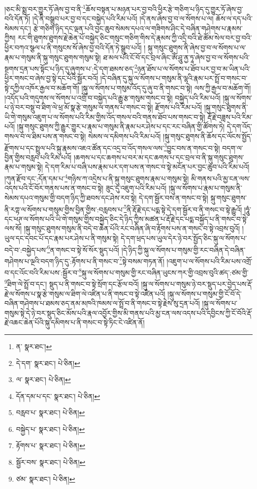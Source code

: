 །ཅང་མི་སྨྲ་བར་གྱུར་ཏོ་ཞེས་བྱ་བ་ནི་\footnote{ན་  སྣར་ཐང་། }ཆོས་བསྟན་པ་མཉན་པར་བྱ་བའི་ཕྱིར་རྩེ་གཅིག་པ་ཉིད་དུ་གྱུར་ཏོ་ཞེས་བྱ་བའི་དོན་ཏོ། །དེ་ནི་བསྒྲུབ་པར་བྱ་བ་དང་བསྐྱེད་པའི་རིམ་པའོ། །དེ་ནས་ཞེས་བྱ་བ་ལ་སོགས་པ་ལ། ཆོས་ལ་དད་པའི་སེམས་དང་། རྩེ་གཅིག་ཉིད་དང་ལྡན་པའི་བྱང་ཆུབ་སེམས་དཔའ་ལ་གཟིགས་ཤིང་དེ་བཞིན་གཤེགས་པ་རྣམས་ཀྱིས། རང་གི་ཐུགས་ཐུགས་རྗེ་ཆེན་པོ་བསྐྱེད་ཅིང་གསུང་གཅིག་གིས་དེ་རྣམས་ཀྱི་འདྲི་བའི་ཐེ་ཚོམ་སེལ་བར་བྱ་བའི་ཕྱིར་བཀའ་སྩལ་པ་ནི་གསུངས་སོ་ཞེས་བྱ་བའི་དོན་ཏེ་སྒྲུབ་པའོ། །
སྐུ་གསུང་ཐུགས་ནི་ཞེས་བྱ་བ་ལ་སོགས་པ་ལ་རྣམ་པ་གསུམ་ནི་སྐུ་གསུང་ཐུགས་གསུམ་སྟེ། ཐ་མལ་པའི་ངོ་བོ་དང་བྲལ་ཞིང་ཨོཾ་ཤཱུ་ནྱ་ཏཱ་ཞེས་བྱ་བ་ལ་སོགས་པའི་སྔགས་དྲན་པས་སྟོང་པ་ཉིད་དུ་ཞུགས་པ་:དེ་དག་ཐམས་ཅད་\footnote{དེ་དག་  སྣར་ཐང་།  པེ་ཅིན། }ཉན་ཐོས་པ་ལ་སོགས་པ་ཐོབ་པར་བྱ་བ་མ་ཡིན་པའི་ཕྱིར་གསང་བ་ཞེས་བྱ་སྟེ་དང་པོའི་སྦྱོར་བའོ། །དེ་བཞིན་དུ་སྐུ་ལ་སོགས་པ་གསུམ་ནི་ལྷའི་རྣམ་པར་སྤྲོ་བ་གསང་བ་སྟེ་དཀྱིལ་འཁོར་རྒྱལ་བ་མཆོག་གོ། །སྐུ་ལ་སོགས་པ་གསུམ་འོད་དུ་ཞུ་བ་ནི་གསང་བ་སྟེ། ལས་ཀྱི་རྒྱལ་བ་མཆོག་གོ། །འདོད་པའི་གདུགས་ལ་སོགས་པ་འགྲོ་བ་བསྐྱེད་པའི་རྒྱུ་རྩ་གསུམ་གསང་བ་སྟེ། བསྐྱེད་པའི་རིམ་པའོ། །སྐུ་ལ་སོགས་པ་ཉེ་བར་བསྡུ་བ་ཐིག་ལེ་ཕྲ་མོ་སྣ་རྩེ་གསུམ་ལ་གནས་པ་གསང་བ་སྟེ། རྫོགས་པའི་རིམ་པའོ། །སྐུ་གསུང་ཐུགས་ནི་ཡི་གེ་གསུམ་འཇུག་པ་ལ་སོགས་པའི་རིམ་གྱིས་འོད་གསལ་བའི་གནས་ཐོབ་པས་གསང་བ་སྟེ། རྡོ་རྗེ་བཟླས་པའི་རིམ་པའོ། །སྐུ་གསུང་ཐུགས་ཀྱི་རྒྱུར་གྱུར་པ་རྣམ་པ་གསུམ་ནི་རྣམ་པར་ཤེས་པ་དང་རང་བཞིན་གྱི་ཚོགས་ཏེ། དེ་དག་འོད་གསལ་བ་ལ་ཐིམ་པས་ན་གསང་བ་སྟེ། སེམས་ལ་དམིགས་པའི་རིམ་པའོ། །སྐུ་གསུང་ཐུགས་ནི་ཆོས་དང་ལོངས་སྤྱོད་རྫོགས་པ་དང་སྤྲུལ་པའི་སྐུ་རྣམས་འཇའ་ཚོན་དང་འདྲ་བ་འོད་གསལ་ལས་\footnote{ལ་  སྣར་ཐང་།  པེ་ཅིན། }བྱུང་བས་ན་གསང་བ་སྟེ། བདག་ལ་བྱིན་གྱིས་བརླབ་པའི་རིམ་པའོ། །ཆགས་པ་དང་ཆགས་པ་བར་མ་དང་ཆགས་པ་དང་བྲལ་བ་ནི་སྐུ་གསུང་ཐུགས་རྣམ་པ་གསུམ་སྟེ། དེ་དག་རིམ་པ་བཞི་པས་རྣམ་པར་དག་པས་ན་གསང་བ་སྟེ་མངོན་པར་བྱང་ཆུབ་པའི་རིམ་པའོ། །ཀུན་རྫོབ་དང་:དོན་དམ་པ་\footnote{དོན་དམ་པ་དང་  སྣར་ཐང་།  པེ་ཅིན། }གཉིས་ཀ་འདྲེས་པ་ནི་སྐུ་གསུང་ཐུགས་རྣམ་པ་གསུམ་སྟེ། མི་གནས་པའི་མྱ་ངན་ལས་འདས་པའི་ངོ་བོར་གནས་པས་ན་གསང་བ་སྟེ། ཟུང་དུ་འཇུག་པའི་རིམ་པའོ། །སྐུ་ལ་སོགས་པ་རྣམ་པ་གསུམ་ནི་སེམས་དཔའ་གསུམ་གྱི་བདག་ཉིད་ཀྱི་ཐབས་དང་ཤེས་རབ་སྟེ། དེ་དག་སྦྱོར་བས་ན་གསང་བ་སྟེ། སྐུ་གསུང་ཐུགས་ནི་རཀྟ་ལ་སོགས་པ་གསུམ་གྱིས་བྱིན་གྱིས་:བརླབས་པ་\footnote{བརླབ་པ་  སྣར་ཐང་།  པེ་ཅིན། }ནི་རྡོ་རྗེ་དང་པདྨ་སྟེ་དེ་དག་སྦྱོར་བ་ནི་གསང་བ་སྟེ་རྒྱུའོ། །ཧཱུཾ་དང་ཕཊ་ལ་སོགས་པའི་ཡི་གེ་གསུམ་གྱིས་བསྐྱེད་ཅིང་དེ་ཉིད་ཀྱིས་མཚན་པ་རྡོ་རྗེ་དང་པདྨ་བསྐྱོད་པ་ནི་གསང་བ་སྟེ་ལས་སོ། །སྐུ་གསུང་ཐུགས་གསུམ་ནི་བདེ་བ་ཆེན་པོའི་རང་བཞིན་ཞི་བ་རྟོགས་པས་ན་གསང་བ་སྟེ་འབྲས་བུའོ། །ཡུལ་དང་དབང་པོ་དང་རྣམ་པར་ཤེས་པ་ནི་གསུམ་སྟེ། དེ་དག་ཕྲད་པས་ཡུལ་དེར་ཉེ་བར་སྤྱོད་ཅིང་སྐུ་ལ་སོགས་པ་བདེ་བ་:བསྐྱེད་པས་\footnote{བསྐྱེད་པ་  སྣར་ཐང་།  པེ་ཅིན། }ན་གསང་བ་སྟེ་སོ་སོར་སྡུད་པའོ། །དེ་ཉིད་ཀྱི་སྐུ་ལ་སོགས་པ་གསུམ་གྱི་རང་བཞིན་དེ་བཞིན་གཤེགས་པ་ལྔའི་བདག་ཉིད་དུ་:རྟོགས་པ་ནི་གསང་བ་\footnote{རྟོགས་པ་  སྣར་ཐང་།  པེ་ཅིན། }སྟེ་བསམ་གཏན་ནོ། །འཇུག་པ་ལ་སོགས་པའི་རིམ་པས་འགྲོ་བ་དང་འོང་བའི་རིམ་པས་:སྦྱོར་བ་\footnote{སྦྱོར་བས་  སྣར་ཐང་།  པེ་ཅིན། }སྐུ་ལ་སོགས་པ་གསུམ་གྱི་རང་བཞིན་ཡུངས་ཀར་གྱི་འབྲས་བུའི་ཚད་:ཙམ་གྱི་\footnote{ཙམ་  སྣར་ཐང་།  པེ་ཅིན། }ཐིག་ལེ་སྤྲོ་བ་དང་། སྡུད་པ་ནི་གསང་བ་སྟེ་སྲོག་དང་རྩོལ་བའོ། །སྐུ་ལ་སོགས་པ་གསུམ་ཉེ་བར་སྡུད་པར་བྱེད་པས་རྡོ་རྗེ་ལ་སོགས་པ་སྣ་རྩེ་གསུམ་ལ་ཐིག་ལེ་འཛིན་པ་ནི་གསང་བ་སྟེ་འཛིན་པའོ། །སྐུ་ལ་སོགས་པ་གསུམ་གྱི་ངོ་བོ་དེ་བཞིན་གཤེགས་པ་ཐམས་ཅད་ནམ་མཁའི་ཁམས་ལ་སྤྲོ་བ་ནི་གསང་བ་སྟེ་རྗེས་སུ་དྲན་པའོ། །སྐུ་ལ་སོགས་པ་གསུམ་སྟེ་དེ་ཉེ་བར་སྡུད་ཅིང་མོས་པའི་རྣལ་འབྱོར་གྱིས་མི་གནས་པའི་མྱ་ངན་ལས་འདས་པའི་དབྱིངས་ཀྱི་ངོ་བོའི་རྡོ་རྗེ་འཆང་ཆེན་པོའི་སྐུ་དམིགས་པ་ནི་གསང་བ་སྟེ་ཏིང་ངེ་འཛིན་ནོ། 